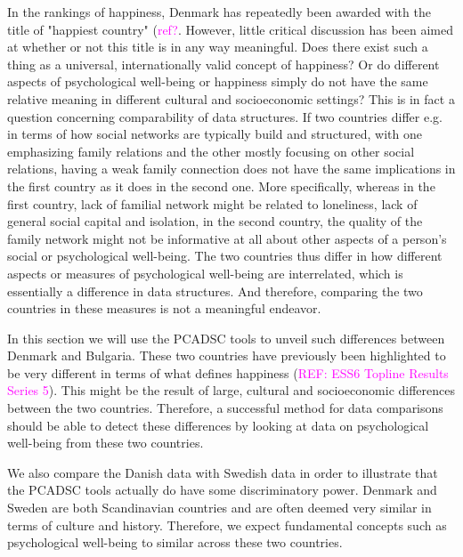 \documentclass[titlepage,11pt,twoside]{article}
\newcommand{\hl}[1]{\textcolor{magenta}{#1}}
\begin{document}
In the rankings of happiness, Denmark has repeatedly been awarded with the title of "happiest country" (\hl{ref?}. However, little critical discussion has been aimed at whether or not this title is in any way meaningful. Does there exist such a thing as a universal, internationally valid concept of happiness? Or do different aspects of psychological well-being or happiness simply do not have the same relative meaning in different cultural and socioeconomic settings? This is in fact a question concerning comparability of data structures. If two countries differ e.g. in terms of how social networks are typically build and structured, with one emphasizing family relations and the other mostly focusing on other social relations, having a weak family connection does not have the same implications in the first country as it does in the second one. More specifically, whereas in the first country, lack of familial network might be related to loneliness, lack of general social capital and isolation, in the second country, the quality of the family network might not be informative at all about other aspects of a person's social or psychological well-being. The two countries thus differ in how different aspects or measures of psychological well-being are interrelated, which is essentially a difference in data structures. And therefore, comparing the two countries in these measures is not a meaningful endeavor.

In this section we will use the PCADSC tools to unveil such differences between Denmark and Bulgaria. These two countries have previously been highlighted to be very different in terms of what defines happiness (\hl{REF: ESS6 Topline Results Series 5}). This might be the result of large, cultural and socioeconomic differences between the two countries. Therefore, a successful method for data comparisons should be able to detect these differences by looking at data on psychological well-being from these two countries.

We also compare the Danish data with Swedish data in order to illustrate that the PCADSC tools actually do have some discriminatory power. Denmark and Sweden are both Scandinavian countries and are often deemed very similar in terms of culture and history. Therefore, we expect fundamental concepts such as psychological well-being to similar across these two countries.


\end{document}
